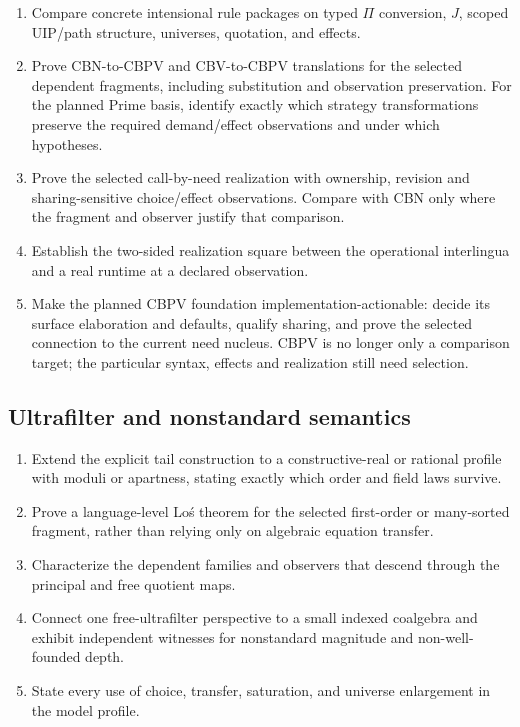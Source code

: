 \documentclass[11pt]{article}
\theoremstyle{definition}
\theoremstyle{remark}
\begin{document}
\begin{enumerate}
\item Compare concrete intensional rule packages on typed $\Pi$ conversion,
  $J$, scoped UIP/path structure, universes, quotation, and effects.
\item Prove CBN-to-CBPV and CBV-to-CBPV translations for the selected dependent
  fragments, including substitution and observation preservation. For the
  planned Prime basis, identify exactly which strategy transformations preserve
  the required demand/effect observations and under which hypotheses.
\item Prove the selected call-by-need realization with ownership, revision and
  sharing-sensitive choice/effect observations. Compare with CBN only where
  the fragment and observer justify that comparison.
\item Establish the two-sided realization square between the operational
  interlingua and a real runtime at a declared observation.
\item Make the planned CBPV foundation implementation-actionable: decide its
  surface elaboration and defaults, qualify sharing, and prove the selected
  connection to the current need nucleus. CBPV is no longer only a comparison
  target; the particular syntax, effects and realization still need selection.
\end{enumerate}

\subsection{Ultrafilter and nonstandard semantics}

\begin{enumerate}
\item Extend the explicit tail construction to a constructive-real or rational
  profile with moduli or apartness, stating exactly which order and field laws
  survive.
\item Prove a language-level Lo\'s theorem for the selected first-order or
  many-sorted fragment, rather than relying only on algebraic equation transfer.
\item Characterize the dependent families and observers that descend through
  the principal and free quotient maps.
\item Connect one free-ultrafilter perspective to a small indexed coalgebra and
  exhibit independent witnesses for nonstandard magnitude and non-well-founded
  depth.
\item State every use of choice, transfer, saturation, and universe enlargement
  in the model profile.
\end{enumerate}
\end{document}
